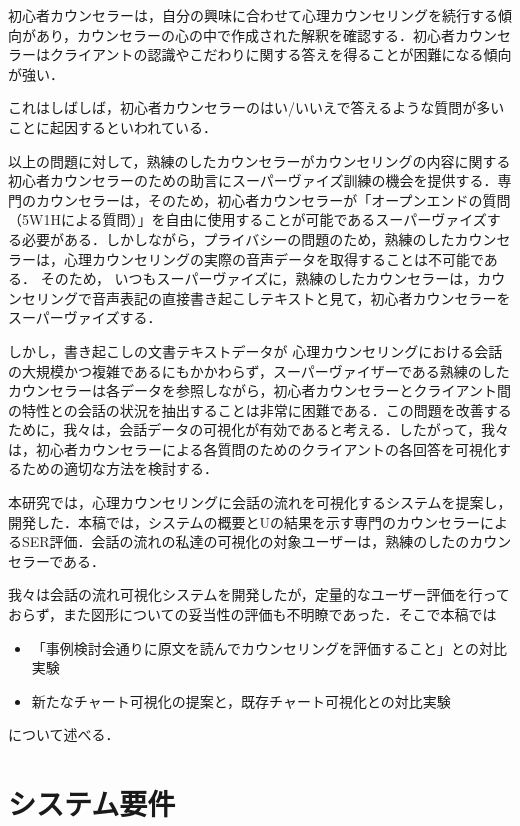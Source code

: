 \documentclass[shuuron]{kuee}
\begin{document}
初心者カウンセラーは，自分の興味に合わせて心理カウンセリングを続行する傾向があり，カウンセラーの心の中で作成された解釈を確認する．初心者カウンセラーはクライアントの認識やこだわりに関する答えを得ることが困難になる傾向が強い．

これはしばしば，初心者カウンセラーのはい/いいえで答えるような質問が多いことに起因するといわれている．

以上の問題に対して，熟練のしたカウンセラーがカウンセリングの内容に関する初心者カウンセラーのための助言にスーパーヴァイズ訓練の機会を提供する．専門のカウンセラーは，そのため，初心者カウンセラーが「オープンエンドの質問（5W1Hによる質問）」を自由に使用することが可能であるスーパーヴァイズする必要がある．しかしながら，プライバシーの問題のため，熟練のしたカウンセラーは，心理カウンセリングの実際の音声データを取得することは不可能である． そのため， いつもスーパーヴァイズに，熟練のしたカウンセラーは，カウンセリングで音声表記の直接書き起こしテキストと見て，初心者カウンセラーをスーパーヴァイズする．

しかし，書き起こしの文書テキストデータが 心理カウンセリングにおける会話の大規模かつ複雑であるにもかかわらず，スーパーヴァイザーである熟練のしたカウンセラーは各データを参照しながら，初心者カウンセラーとクライアント間の特性との会話の状況を抽出することは非常に困難である．この問題を改善するために，我々は，会話データの可視化が有効であると考える．したがって，我々は，初心者カウンセラーによる各質問のためのクライアントの各回答を可視化するための適切な方法を検討する．

本研究では，心理カウンセリングに会話の流れを可視化するシステムを提案し，開発した．本稿では，システムの概要とUの結果を示す専門のカウンセラーによるSER評価．会話の流れの私達の可視化の対象ユーザーは，熟練のしたのカウンセラーである．

我々\cite{uetsuji}は会話の流れ可視化システムを開発したが，定量的なユーザー評価を行っておらず，また図形についての妥当性の評価も不明瞭であった．そこで本稿では
\begin{itemize}
  \item 「事例検討会通りに原文を読んでカウンセリングを評価すること」との対比実験
  \item 新たなチャート可視化の提案と，既存チャート可視化との対比実験
\end{itemize}
について述べる．


\section{システム要件}
\end{document}
